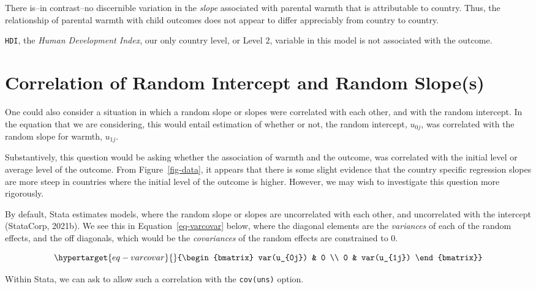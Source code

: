 \documentclass[
  letterpaper,
  DIV=11,
  numbers=noendperiod]{scrreprt}
\begin{document}
There is--in contrast--no discernible variation in the \emph{slope}
associated with parental warmth that is attributable to country. Thus,
the relationship of parental warmth with child outcomes does not appear
to differ appreciably from country to country.

\texttt{HDI}, the \emph{Human Development Index}, our only country
level, or Level 2, variable in this model is not associated with the
outcome.

\hypertarget{correlation-of-random-intercept-and-random-slopes}{%
\section{Correlation of Random Intercept and Random
Slope(s)}\label{correlation-of-random-intercept-and-random-slopes}}

One could also consider a situation in which a random slope or slopes
were correlated with each other, and with the random intercept. In the
equation that we are considering, this would entail estimation of
whether or not, the random intercept, \(u_{0j}\), was correlated with
the random slope for warmth, \(u_{1j}\).

Substantively, this question would be asking whether the association of
warmth and the outcome, was correlated with the initial level or average
level of the outcome. From Figure~\ref{fig-data}, it appears that there
is some slight evidence that the country specific regression slopes are
more steep in countries where the initial level of the outcome is
higher. However, we may wish to investigate this question more
rigorously.

By default, Stata estimates models, where the random slope or slopes are
uncorrelated with each other, and uncorrelated with the intercept
(StataCorp, 2021b). We see this in Equation~\ref{eq-varcovar} below,
where the diagonal elements are the \emph{variances} of each of the
random effects, and the off diagonals, which would be the
\emph{covariances} of the random effects are constrained to 0.

\begin{equation}\protect\hypertarget{eq-varcovar}{}{\begin{bmatrix}
var(u_{0j}) & 0 \\
0 & var(u_{1j}) 
\end{bmatrix}}\label{eq-varcovar}\end{equation}

Within Stata, we can ask to allow such a correlation with the
\texttt{cov(uns)} option.
\end{document}
